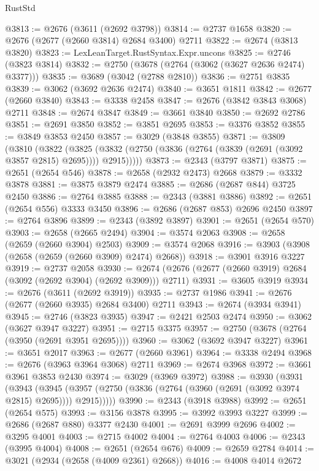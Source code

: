 \begin{lexlean}{RustStd}
\begin{coremodule}
@3813 := @2676 (@3611 (@2692 @3798))
@3814 := @2737 @1658
@3820 := @2676 (@2677 (@2660 @3814) @2684 @3400) @2711
@3822 := @2674 (@3813 @3820)
@3823 := LexLeanTarget.RustSyntax.Expr.uncons
@3825 := @2746 (@3823 @3814)
@3832 := @2750 (@3678 (@2764 (@3062 (@3627 @2636 @2474) @3377)))
@3835 := @3689 (@3042 (@2788 @2810))
@3836 := @2751 @3835
@3839 := @3062 (@3692 @2636 @2474)
@3840 := @3651 @1811
@3842 := @2677 (@2660 @3840)
@3843 := @3338 @2458
@3847 := @2676 (@3842 @3843 @3068) @2711
@3848 := @2674 @3847
@3849 := @3661 @3840
@3850 := @2692 @2786
@3851 := @2691 @3850
@3852 := @3851 @2695
@3853 := @3376 @3852
@3855 := @3849 @3853 @2450
@3857 := @3029 (@3848 @3855)
@3871 := @3809
    (@3810
      (@3822
        (@3825 (@3832 (@2750 (@3836 (@2764 (@3839 (@2691 (@3092 @3857 @2815) @2695)))) @2915)))))
@3873 := @2343 (@3797 @3871)
@3875 := @2651 (@2654 @546)
@3878 := @2658 (@2932 @2473) @2668
@3879 := @3332 @3878
@3881 := @3875 @3879 @2474
@3885 := @2686 (@2687 @844) @3725 @2450
@3886 := @2764 @3885
@3888 := @2343 (@3881 @3886)
@3892 := @2651 (@2654 @556) @3333 @3450
@3896 := @2686 (@2687 @853) @2696 @2450
@3897 := @2764 @3896
@3899 := @2343 (@3892 @3897)
@3901 := @2651 (@2654 @570)
@3903 := @2658 (@2665 @2494)
@3904 := @3574 @2063
@3908 := @2658 (@2659 (@2660 @3904) @2503)
@3909 := @3574 @2068
@3916 := @3903 (@3908 (@2658 (@2659 (@2660 @3909) @2474) @2668))
@3918 := @3901 @3916 @3227
@3919 := @2737 @2058
@3930 := @2674 (@2676 (@2677 (@2660 @3919) @2684 (@3092 (@2692 @3904) (@2692 @3909))) @2711)
@3931 := @3605 @3919
@3934 := @2676 (@3611 (@2692 @3919))
@3935 := @2737 @1986
@3941 := @2676 (@2677 (@2660 @3935) @2684 @3400) @2711
@3943 := @2674 (@3934 @3941)
@3945 := @2746 (@3823 @3935)
@3947 := @2421 @2503 @2474
@3950 := @3062 (@3627 @3947 @3227)
@3951 := @2715 @3375
@3957 := @2750 (@3678 (@2764 (@3950 (@2691 @3951 @2695))))
@3960 := @3062 (@3692 @3947 @3227)
@3961 := @3651 @2017
@3963 := @2677 (@2660 @3961)
@3964 := @3338 @2494
@3968 := @2676 (@3963 @3964 @3068) @2711
@3969 := @2674 @3968
@3972 := @3661 @3961 @3853 @2430
@3974 := @3029 (@3969 @3972)
@3988 := @3930
    (@3931
      (@3943
        (@3945 (@3957 (@2750 (@3836 (@2764 (@3960 (@2691 (@3092 @3974 @2815) @2695)))) @2915)))))
@3990 := @2343 (@3918 @3988)
@3992 := @2651 (@2654 @575)
@3993 := @3156 @3878
@3995 := @3992 @3993 @3227
@3999 := @2686 (@2687 @880) @3377 @2430
@4001 := @2691 @3999 @2696
@4002 := @3295 @4001
@4003 := @2715 @4002
@4004 := @2764 @4003
@4006 := @2343 (@3995 @4004)
@4008 := @2651 (@2654 @676)
@4009 := @2659 @2784
@4014 := @3021 (@2934 (@2658 (@4009 @2361) @2668))
@4016 := @4008 @4014 @2672

\end{coremodule}
\end{lexlean}
